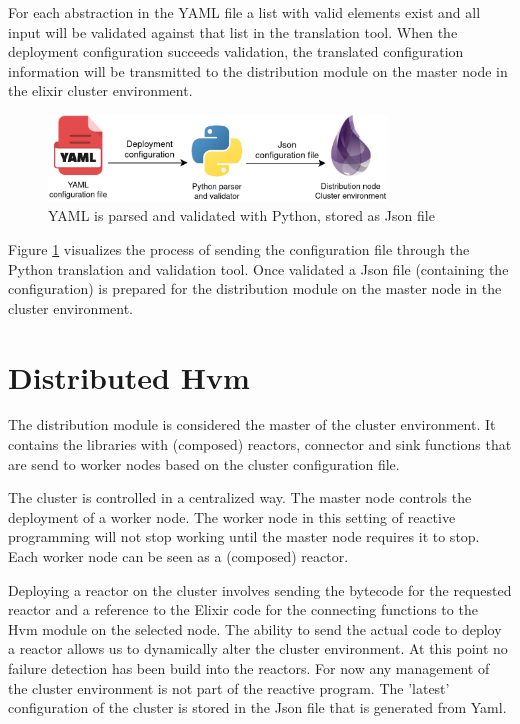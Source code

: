 \documentclass[a4paper]{book}
\begin{document}
 For each abstraction in the YAML file a list with valid elements exist and all input will be validated against that list in the translation tool. When the deployment configuration succeeds validation, the translated configuration information will be transmitted to the distribution module on the master node in the elixir cluster environment. 

\begin{figure}[h]
	\centering
	\includegraphics[width=0.8\textwidth]{yaml.drawio}
	\caption{YAML is parsed and validated with Python, stored as Json file}
	\label{fig:yaml}
\end{figure}  

Figure \ref{fig:yaml} visualizes the process of sending the configuration file through the Python translation and validation tool. Once validated a Json file (containing the configuration) is prepared for the distribution module on the master node in the cluster environment.


\section{Distributed Hvm}
The distribution module is considered the master of the cluster environment. It contains the libraries with (composed) reactors, connector and sink functions that are send to worker nodes based on the cluster configuration file. 

The cluster is controlled in a centralized way. The master node controls the deployment of a worker node. The worker node in this setting of reactive programming will not stop working until the master node requires it to stop. Each worker node can be seen as a (composed) reactor.  

Deploying a reactor on the cluster involves sending the bytecode for the requested reactor and a reference to the Elixir code for the connecting functions to the Hvm module on the selected node. The ability to send the actual code to deploy a reactor allows us to dynamically alter the cluster environment. At this point no failure detection has been build into the reactors. For now any management of the cluster environment is not part of the reactive program. The 'latest' configuration of the cluster is stored in the Json file that is generated from Yaml.  
\end{document}
